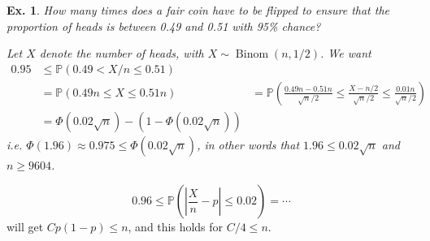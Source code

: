 \documentclass[12pt, a4paper]{book}
\DeclareMathOperator{\Binom}{Binom}
\renewcommand{\Pr}{\mathbb{P}}
\newtheorem{example}[theorem]{Ex.}
\theoremstyle{nonumberplain}
\begin{document}
\begin{example}
    How many times does a fair coin have to be flipped to ensure that the proportion of heads is between 0.49 and 0.51 with 95\% chance?

    Let $X$ denote the number of heads, with $X\sim\Binom(n,1/2)$.
    We want
    \begin{align*}
        0.95&\leq\Pr(0.49<X/n\leq 0.51)\\
            &=\Pr(0.49n\leq X\leq 0.51n)\
            &= \Pr\left(\frac{0.49n-0.51n}{\sqrt{n}/2}\leq\frac{X-n/2}{\sqrt{n}/2}\leq\frac{0.01n}{\sqrt{n}/2}\right)\\
            &= \Phi(0.02\sqrt{n})-(1-\Phi(0.02\sqrt{n}))
    \end{align*}
    i.e. $\Phi(1.96)\approx 0.975\leq\Phi(0.02\sqrt{n})$, in other words that $1.96\leq 0.02\sqrt{n}$ and $n\geq 9604$.
\end{example}
\[0.96\leq \Pr\left(\left\lvert\frac{X}{n}-p\right\rvert\leq 0.02\right)=\cdots\]
will get $Cp(1-p)\leq n$, and this holds for $C/4\leq n$.
\end{document}
